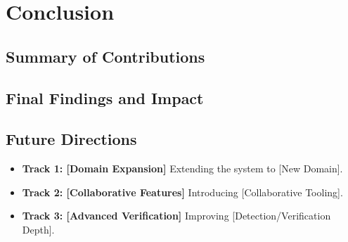 
\section{Conclusion}
\label{sec:conclusion}


\subsection{Summary of Contributions}
\label{subsec:summary}


\subsection{Final Findings and Impact}
\label{subsec:final_impact}


\subsection{Future Directions}
\label{subsec:future_work}


\begin{itemize}
	\item \textbf{Track 1: [Domain Expansion]} Extending the system to [New Domain].
	\item \textbf{Track 2: [Collaborative Features]} Introducing [Collaborative Tooling].
	\item \textbf{Track 3: [Advanced Verification]} Improving [Detection/Verification Depth].
\end{itemize}


